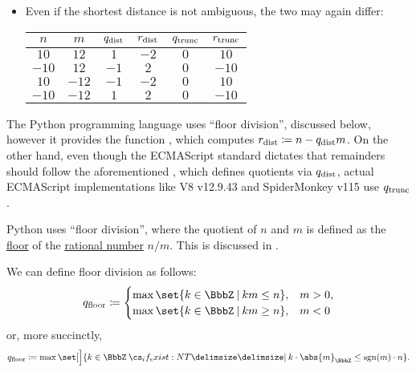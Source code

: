 \begin{remark}
\begin{thmenum}
\begin{itemize}
      \item Even if the shortest distance is not ambiguous, the two may again differ:
      \begin{center}
        \begin{tabular}{c c | c c | c c}
          \( n \)   & \( m \)   & \( q_{\T{dist}} \) & \( r_{\T{dist}} \) & \( q_{\T{trunc}} \) & \( r_{\T{trunc}} \) \\
          \hline
          \( 10 \)  & \( 12 \)  & \( 1 \)            & \( -2 \)           & \( 0 \)             & \( 10 \) \\
          \( -10 \) & \( 12 \)  & \( -1 \)           & \( 2 \)            & \( 0 \)             & \( -10 \) \\
          \( 10 \)  & \( -12 \) & \( -1 \)           & \( -2 \)           & \( 0 \)             & \( 10 \) \\
          \( -10 \) & \( -12 \) & \( 1 \)            & \( 2 \)            & \( 0 \)             & \( -10 \)
        \end{tabular}
      \end{center}
    \end{itemize}

    The Python programming language uses \enquote{floor division}, discussed below, however it provides the function , which computes \( r_{\T{dist}} \coloneqq n - q_{\T{dist}} m \). On the other hand, even though the ECMAScript standard \cite[\S 6.1.6.1.5]{ECMA:262} dictates that remainders should follow the aforementioned \cite{IEEE:754:2019}, which defines quotients via \( q_{\T{dist}} \), actual ECMAScript implementations like V8 v12.9.43 and SpiderMonkey v115 use \( q_{\T{trunc}} \).

     Python uses \enquote{floor division}, where the quotient of \( n \) and \( m \) is defined as the \hyperref[def:real_floor_ceiling]{floor} of the \hyperref[def:rational_number]{rational number} \( n / m \). This is discussed in \cite{PEP:238}.

    We can define floor division as follows:
    \begin{equation}\label{eq:rem:integer_division_uniqueness/floor/q_cases}
      q_{\floor} \coloneqq \begin{cases}
        \max\set{ k \in \BbbZ \given km \leq n }, &m > 0, \\
        \max\set{ k \in \BbbZ \given km \geq n }, &m < 0
      \end{cases}
    \end{equation}
    or, more succinctly,
    \begin{equation}\label{eq:rem:integer_division_uniqueness/floor/q}
      q_{\floor} \coloneqq \max\set[\Big]{ k \in \BbbZ \given* k \cdot \abs{m}_\BbbZ \leq \sgn(m) \cdot n }.
    \end{equation}


\end{thmenum}
\end{remark}
